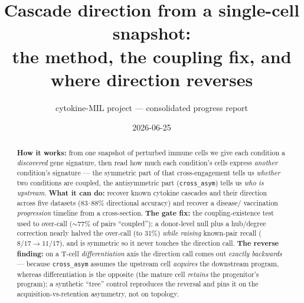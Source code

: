 \documentclass[11pt]{article}
\title{\vspace{-3em}\textbf{Cascade direction from a single-cell snapshot:\\
the method, the coupling fix, and where direction reverses}}
\author{\normalsize cytokine-MIL project --- consolidated progress report}
\date{\vspace{-1em}\normalsize 2026-06-25}
\begin{document}
\maketitle
\vspace{-2.0em}

\begin{abstract}
\noindent\textbf{How it works:} from one snapshot of perturbed immune cells we give each
condition a \emph{discovered} gene signature, then read how much each condition's cells express
\emph{another} condition's signature --- the symmetric part of that cross-engagement tells us
\emph{whether} two conditions are coupled, the antisymmetric part (\texttt{cross\_asym}) tells us
\emph{who is upstream}. \textbf{What it can do:} recover known cytokine cascades and their
direction across five datasets ($83$--$88\%$ directional accuracy) and recover a disease/
vaccination \emph{progression} timeline from a cross-section. \textbf{The gate fix:} the
coupling-existence test used to over-call ($\sim$77\% of pairs ``coupled''); a donor-level null
plus a hub/degree correction nearly halved the over-call (to 31\%) \emph{while raising} known-pair
recall ($8/17\!\to\!11/17$), and is symmetric so it never touches the direction call.
\textbf{The reverse finding:} on a T-cell \emph{differentiation} axis the direction call comes out
\emph{exactly backwards} --- because \texttt{cross\_asym} assumes the upstream cell \emph{acquires}
the downstream program, whereas differentiation is the opposite (the mature cell \emph{retains}
the progenitor's program); a synthetic ``tree'' control reproduces the reversal and pins it on the
acquisition-vs-retention asymmetry, not on topology.
\end{abstract}
\end{document}
